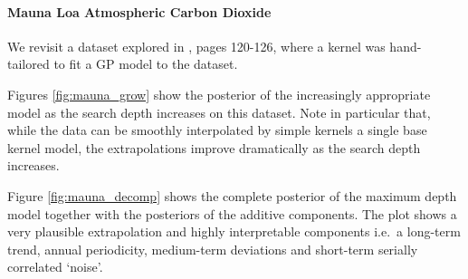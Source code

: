 \documentclass[twoside]{article}
\begin{document}
\paragraph{Mauna Loa Atmospheric Carbon Dioxide}

We revisit a dataset explored in \cite{rasmussen38gaussian}, pages 120-126, where a kernel was hand-tailored to fit a GP model to the dataset.

Figures \ref{fig:mauna_grow} show the posterior of the increasingly appropriate model as the search depth increases on this dataset.
Note in particular that, while the data can be smoothly interpolated by simple kernels a single base kernel model, the extrapolations improve dramatically as the search depth increases.

Figure \ref{fig:mauna_decomp} shows the complete posterior of the maximum depth model together with the posteriors of the additive components.
The plot shows a very plausible extrapolation and highly interpretable components i.e.~a long-term trend, annual periodicity, medium-term deviations and short-term serially correlated `noise'.
\end{document}

